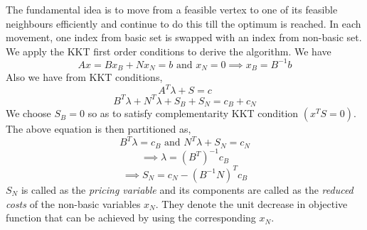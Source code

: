 \documentclass[12pt,letterpaper]{article}
\begin{document}
The fundamental idea is to move from a feasible vertex to one of its feasible neighbours efficiently and continue to do this till the optimum is reached. In each movement, one index from basic set is swapped with an index from non-basic set. We apply the KKT first order conditions to derive the algorithm. We have
\begin{equation}
Ax = Bx_B + Nx_N = b \text{ and } x_N = 0 \implies x_B = B^{-1}b
\end{equation}
Also we have from KKT conditions,
\begin{equation*}
	A^T\lambda+S = c
\end{equation*}
\begin{equation}
		B^T\lambda+N^T\lambda+S_B+S_N=c_B+c_N
\end{equation}
We choose $S_B = 0$ so as to satisfy complementarity KKT condition $(x^TS=0)$. The above equation is then partitioned as,
\begin{equation*}
B^T\lambda = c_B \text{ and } N^T\lambda+S_N=c_N
\end{equation*}
\begin{equation}
\implies \lambda = (B^T)^{-1}c_B
\label{eqn3}
\end{equation}
\begin{equation}
\implies S_N = c_N - (B^{-1}N)^Tc_B
\end{equation}
$S_N$ is called as the \emph{pricing variable} and its components are called as the \emph{reduced costs} of the non-basic variables $x_N$. They denote the unit decrease in objective function that can be achieved by using the corresponding $x_N$.
\end{document}
